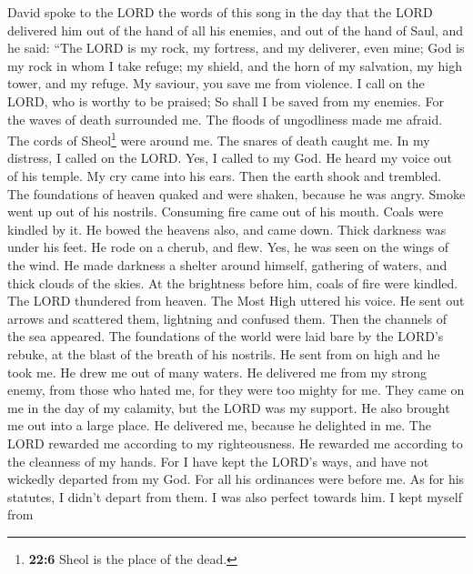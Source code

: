  David spoke to the LORD the words of this song in the day
that the LORD delivered him out of the hand of all his enemies, and out
of the hand of Saul,  and he said: ``The LORD is my rock,
my fortress, and my deliverer, even mine;  God is my rock
in whom I take refuge; my shield, and the horn of my salvation, my high
tower, and my refuge. My saviour, you save me from violence.
 I call on the LORD, who is worthy to be praised; So shall
I be saved from my enemies.  For the waves of death
surrounded me. The floods of ungodliness made me afraid. 
The cords of Sheol\footnote{\textbf{22:6} Sheol is the place of the
  dead.} were around me. The snares of death caught me. 
In my distress, I called on the LORD. Yes, I called to my God. He heard
my voice out of his temple. My cry came into his ears. 
Then the earth shook and trembled. The foundations of heaven quaked and
were shaken, because he was angry.  Smoke went up out of
his nostrils. Consuming fire came out of his mouth. Coals were kindled
by it.  He bowed the heavens also, and came down. Thick
darkness was under his feet.  He rode on a cherub, and
flew. Yes, he was seen on the wings of the wind.  He made
darkness a shelter around himself, gathering of waters, and thick clouds
of the skies.  At the brightness before him, coals of
fire were kindled.  The LORD thundered from heaven. The
Most High uttered his voice.  He sent out arrows and
scattered them, lightning and confused them.  Then the
channels of the sea appeared. The foundations of the world were laid
bare by the LORD's rebuke, at the blast of the breath of his nostrils.
 He sent from on high and he took me. He drew me out of
many waters.  He delivered me from my strong enemy, from
those who hated me, for they were too mighty for me. 
They came on me in the day of my calamity, but the LORD was my support.
 He also brought me out into a large place. He delivered
me, because he delighted in me.  The LORD rewarded me
according to my righteousness. He rewarded me according to the cleanness
of my hands.  For I have kept the LORD's ways, and have
not wickedly departed from my God.  For all his
ordinances were before me. As for his statutes, I didn't depart from
them.  I was also perfect towards him. I kept myself from
